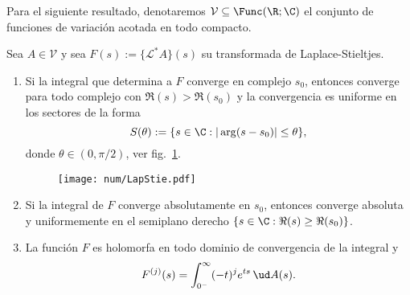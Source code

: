 \documentclass[teoria-numeros.tex]{subfiles}
\begin{document}
Para el siguiente resultado, denotaremos $\mathcal{V} \subseteq \Func(\R; \C)$ el conjunto de funciones de variación acotada en todo compacto.
\begin{thm}\label{thm:conv_abscissa}
	Sea $A \in \mathcal{V}$ y sea $F(s) := \{ \mathcal{L}^* A \}(s)$ su transformada de Laplace-Stieltjes.
	\begin{enumerate}
		\item Si la integral que determina a $F$ converge en complejo $s_0$, entonces converge para todo complejo con $\Re(s) > \Re(s_0)$
			y la convergencia es uniforme en los sectores de la forma
			\[
				S(\theta) := \{ s \in \C : |\arg(s - s_0)| \le \theta \},
			\]
			donde $\theta \in (0, \pi/2)$, ver fig.~\ref{fig:num/LapStie}.
			\begin{figure}[!hbtp]
				\centering
				\texttt{[image: num/LapStie.pdf]}
				\caption{}%
				\label{fig:num/LapStie}
			\end{figure}
		\item Si la integral de $F$ converge absolutamente en $s_0$, entonces converge absoluta y uniformemente
			en el semiplano derecho $\{ s \in \C : \Re(s) \ge \Re(s_0) \}$.
		\item La función $F$ es holomorfa en todo dominio de convergencia de la integral y
			\[
				F^{(j)}(s) = \int_{0^-}^{\infty} (-t)^j e^{ts} \, \ud A(s).
			\]
	\end{enumerate}
\end{thm}
\end{document}
